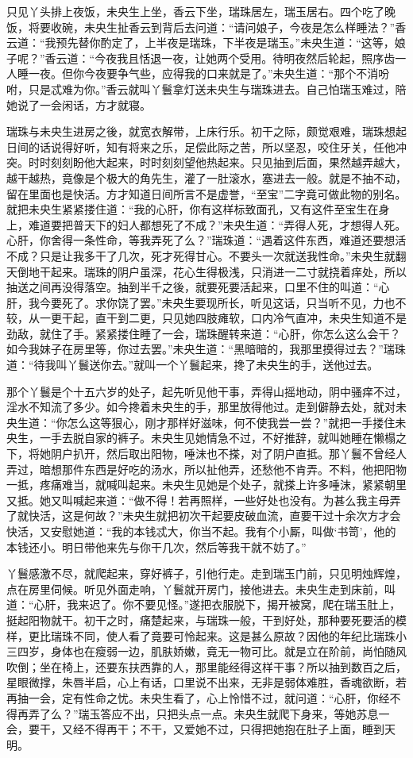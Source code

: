 \documentclass[a4paper,12pt,UTF8,twoside]{ctexbook}
\begin{document}
只见丫头排上夜饭，未央生上坐，香云下坐，瑞珠居左，瑞玉居右。四个吃了晚饭，将要收碗，未央生扯香云到背后去问道：“请问娘子，今夜是怎么样睡法？”香云道：“我预先替你酌定了，上半夜是瑞珠，下半夜是瑞玉。”未央生道：“这等，娘子呢？”香云道：“今夜我且恬退一夜，让她两个受用。待明夜然后轮起，照序齿一人睡一夜。但你今夜要争气些，应得我的口来就是了。”未央生道：“那个不消吩咐，只是忒难为你。”香云就叫丫鬟拿灯送未央生与瑞珠进去。自己怕瑞玉难过，陪她说了一会闲话，方才就寝。

瑞珠与未央生进房之後，就宽衣解带，上床行乐。初干之际，颇觉艰难，瑞珠想起日间的话说得好听，知有将来之乐，足偿此际之苦，所以坚忍，咬住牙关，任他冲突。时时刻刻盼他大起来，时时刻刻望他热起来。只见抽到后面，果然越弄越大，越干越热，竟像是个极大的角先生，灌了一肚滚水，塞进去一般。就是不抽不动，留在里面也是快活。方才知道日间所言不是虚誉，“至宝”二字竟可做此物的别名。就把未央生紧紧搂住道：“我的心肝，你有这样标致面孔，又有这件至宝生在身上，难道要把普天下的妇人都想死了不成？”未央生道：“弄得人死，才想得人死。心肝，你舍得一条性命，等我弄死了么？”瑞珠道：“遇着这件东西，难道还要想活不成？只是让我多干了几次，死才死得甘心。不要头一次就送我性命。”未央生就翻天倒地干起来。瑞珠的阴户虽深，花心生得极浅，只消进一二寸就挠着痒处，所以抽送之间再没得落空。抽到半千之後，就要死要活起来，口里不住的叫道：“心肝，我今要死了。求你饶了罢。”未央生要现所长，听见这话，只当听不见，力也不较，从一更干起，直干到二更，只见她四肢瘫软，口内冷气直冲，未央生知道不是劲敌，就住了手。紧紧搂住睡了一会，瑞珠醒转来道：“心肝，你怎么这么会干？如今我妹子在房里等，你过去罢。”未央生道：“黑暗暗的，我那里摸得过去？”瑞珠道：“待我叫丫鬟送你去。”就叫一个丫鬟起来，搀了未央生的手，送他过去。

那个丫鬟是个十五六岁的处子，起先听见他干事，弄得山摇地动，阴中骚痒不过，淫水不知流了多少。如今搀着未央生的手，那里放得他过。走到僻静去处，就对未央生道：“你怎么这等狠心，刚才那样好滋味，何不使我尝一尝？”就把一手搂住未央生，一手去脱自家的裤子。未央生见她情急不过，不好推辞，就叫她睡在懒榻之下，将她阴户扒开，然后取出阳物，唾沫也不搽，对了阴户直抵。那丫鬟不曾经人弄过，暗想那件东西是好吃的汤水，所以扯他弄，还愁他不肯弄。不料，他把阳物一抵，疼痛难当，就喊叫起来。未央生见她是个处子，就搽上许多唾沫，紧紧朝里又抵。她又叫喊起来道：“做不得！若再照样，一些好处也没有。为甚么我主母弄了就快活，这是何故？”未央生就把初次干起要皮破血流，直要干过十余次方才会快活，又安慰她道：“我的本钱忒大，你当不起。我有个小厮，叫做‘书笥’，他的本钱还小。明日带他来先与你干几次，然后等我干就不妨了。”

丫鬟感激不尽，就爬起来，穿好裤子，引他行走。走到瑞玉门前，只见明烛辉煌，点在房里伺候。听见外面走响，丫鬟就开房门，接他进去。未央生走到床前，叫道：“心肝，我来迟了。你不要见怪。”遂把衣服脱下，揭开被窝，爬在瑞玉肚上，挺起阳物就干。初干之时，痛楚起来，与瑞珠一般，干到好处，那种要死要活的模样，更比瑞珠不同，使人看了竟要可怜起来。这是甚么原故？因他的年纪比瑞珠小三四岁，身体也在瘦弱一边，肌肤娇嫩，竟无一物可比。就是立在阶前，尚怕随风吹倒；坐在椅上，还要东扶西靠的人，那里能经得这样干事？所以抽到数百之后，星眼微撑，朱唇半启，心上有话，口里说不出来，无非是弱体难胜，香魂欲断，若再抽一会，定有性命之忧。未央生看了，心上怜惜不过，就问道：“心肝，你经不得再弄了么？”瑞玉答应不出，只把头点一点。未央生就爬下身来，等她苏息一会，要干，又经不得再干；不干，又爱她不过，只得把她抱在肚子上面，睡到天明。
\end{document}
